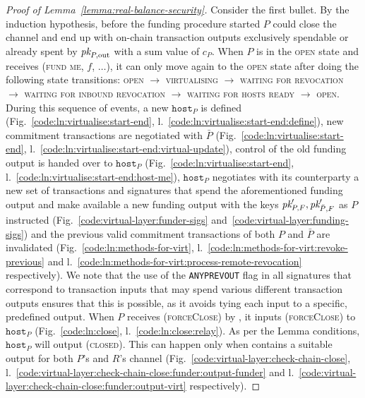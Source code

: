 \begin{proof}[Proof of Lemma~\ref{lemma:real-balance-security}]
  Consider the first bullet.
  By the induction hypothesis, before the funding procedure started $P$ could
  close the channel and end up with on-chain transaction outputs exclusively
  spendable or already spent by $\textit{pk}_{P, \mathrm{out}}$ with a sum value of
  $c_P$. When $P$ is in the \textsc{open} state and receives (\textsc{fund me},
  $f$, $\dots$), it can only move again to the \textsc{open} state after doing
  the following state transitions: \textsc{open} $\rightarrow$
  \textsc{virtualising} $\rightarrow$ \textsc{waiting for revocation}
  $\rightarrow$ \textsc{waiting for inbound revocation} $\rightarrow$
  \textsc{waiting for hosts ready} $\rightarrow$ \textsc{open}. During this
  sequence of events, a new $\texttt{host}_P$ is defined
  (Fig.~\ref{code:ln:virtualise:start-end},
  l.~\ref{code:ln:virtualise:start-end:define}), new commitment transactions are
  negotiated with $\bar{P}$ (Fig.~\ref{code:ln:virtualise:start-end},
  l.~\ref{code:ln:virtualise:start-end:virtual-update}), control of the old
  funding output is handed over to $\texttt{host}_P$
  (Fig.~\ref{code:ln:virtualise:start-end},
  l.~\ref{code:ln:virtualise:start-end:host-me}), $\texttt{host}_P$ negotiates
  with its counterparty a new set of transactions and signatures that spend the
  aforementioned funding output and make available a new funding output with the
  keys $\textit{pk}_{P, F}', \textit{pk}_{\bar{P}, F}'$ as $P$ instructed
  (Fig.~\ref{code:virtual-layer:funder-sigs}
  and~\ref{code:virtual-layer:funding-sigs}) and the previous valid commitment
  transactions of both $P$ and $\bar{P}$ are invalidated
  (Fig.~\ref{code:ln:methods-for-virt},
  l.~\ref{code:ln:methods-for-virt:revoke-previous} and
  l.~\ref{code:ln:methods-for-virt:process-remote-revocation} respectively). We
  note that the use of the \texttt{ANYPREVOUT} flag in all signatures that
  correspond to transaction inputs that may spend various different transaction
  outputs ensures that this is possible, as it avoids tying each input to a
  specific, predefined output. When $P$ receives (\textsc{forceClose}) by
  \environment, it inputs (\textsc{forceClose}) to $\texttt{host}_P$
  (Fig.~\ref{code:ln:close}, l.~\ref{code:ln:close:relay}). As per the Lemma
  conditions, $\texttt{host}_P$ will output (\textsc{closed}). This can happen
  only when \ledger contains a suitable output for both $P$'s and $R$'s channel
  (Fig.~\ref{code:virtual-layer:check-chain-close},
  l.~\ref{code:virtual-layer:check-chain-close:funder:output-funder} and
  l.~\ref{code:virtual-layer:check-chain-close:funder:output-virt}
  respectively).


\end{proof}

